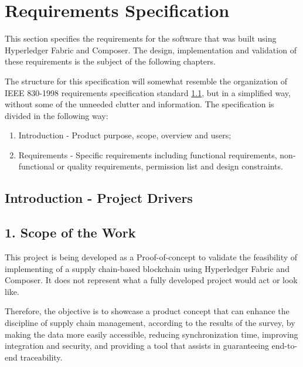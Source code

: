 \section{Requirements Specification}
\label{sec:requirements-specs}
This section specifies the requirements for the software that was built using Hyperledger Fabric and Composer. The design, implementation and validation of these requirements is the subject of the following chapters.

The structure for this specification will somewhat resemble the organization of IEEE 830-1998 requirements specification standard \ref{}, but in a simplified way, without some of the unneeded clutter and information. The specification is divided in the following way:
\begin{enumerate}
	\item Introduction - Product purpose, scope, overview and users;
	\item Requirements - Specific requirements including functional requirements, non-functional or quality requirements, permission list and design constraints.
\end{enumerate}

\subsection{Introduction - Project Drivers}

\subsection*{1. Scope of the Work}
		\par This project is being developed as a Proof-of-concept to validate the feasibility of implementing of a supply chain-based blockchain using Hyperledger Fabric and Composer. It does not represent what a fully developed project would act or look like.

		\par Therefore, the objective is to showcase a product concept that can enhance the discipline of supply chain management, according to the results of the survey, by making the data more easily accessible, reducing synchronization time, improving integration and security, and providing a tool that assists in guaranteeing end-to-end traceability.

